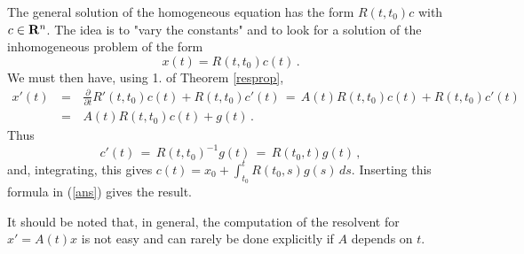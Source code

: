 \documentclass[12pt]{report}
\newcommand{\bR}{{\bf R}}
\newcommand{\proof}{\noindent {\em Proof:~}}
\newcommand{\nn}{\nonumber}
\def\eqref#1{(\ref{#1})}
\def\qed{\hbox{\hskip 6pt\vrule width6pt height7pt depth1pt
    \hskip1pt}\bigskip}
\begin{document}
\proof The general solution of the homogeneous equation has the form
 $R(t,t_0)c$ with $c \in \bR^n$. The idea is to "vary the constants"
 and to look for a solution of the inhomogeneous problem of the form
 \begin{equation}\label{ans}
 x(t)=R(t,t_0)c(t)\,.
 \end{equation} 
We must then have, using 1. of Theorem \ref{resprop},
 \begin{eqnarray}
 x'(t)\,&=&\, \frac{\partial}{\partial t} R'(t,t_0) c(t) + R(t,t_0)c'(t)
\,=\, A(t)R(t,t_0)c(t) +
 R(t,t_0)c'(t) \nn \\ \,&=&\, A(t)R(t,t_0)c(t) + g(t) \,.
 \end{eqnarray}
Thus   
\begin{equation}
c'(t) \,=\, R(t,t_0)^{-1} g(t) \,=\, R(t_0,t)g(t) \,,
\end{equation}
and, integrating, this gives $c(t)= x_0 + \int_{t_0}^t R(t_0, s)
g(s)\, ds$. Inserting this formula in \eqref{ans} gives the
result. \hfill \qed



It should be noted that, in general, the computation of the resolvent
for $x'=A(t)x$ is not easy and can rarely be done explicitly if $A$
depends on $t$.
\end{document}
